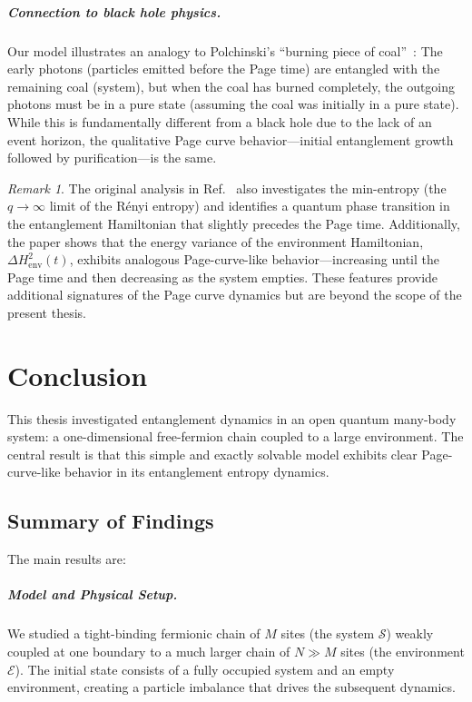 \documentclass[12pt,oneside,openright]{report}
\theoremstyle{definition}
\theoremstyle{plain}
\theoremstyle{remark}
\newtheorem{remark}{Remark}[chapter]
\begin{document}
\paragraph{Connection to black hole physics.}
Our model illustrates an analogy to Polchinski's ``burning piece of coal''~\cite{Polchinski_2016}: The early photons (particles emitted before the Page time) are entangled with the remaining coal (system), but when the coal has burned completely, the outgoing photons must be in a pure state (assuming the coal was initially in a pure state). While this is fundamentally different from a black hole due to the lack of an event horizon, the qualitative Page curve behavior---initial entanglement growth followed by purification---is the same.

\begin{remark}
The original analysis in Ref.~\cite{Kehrein_2024} also investigates the min-entropy (the $q \to \infty$ limit of the Rényi entropy) and identifies a quantum phase transition in the entanglement Hamiltonian that slightly precedes the Page time. Additionally, the paper shows that the energy variance of the environment Hamiltonian, $\Delta H_{\mathrm{env}}^2(t)$, exhibits analogous Page-curve-like behavior---increasing until the Page time and then decreasing as the system empties. These features provide additional signatures of the Page curve dynamics but are beyond the scope of the present thesis.
\end{remark}

\chapter{Conclusion}
\label{ch:conclusion}

This thesis investigated entanglement dynamics in an open quantum many-body system: a one-dimensional free-fermion chain coupled to a large environment.
The central result is that this simple and exactly solvable model exhibits clear Page-curve-like behavior in its entanglement entropy dynamics.

\section{Summary of Findings}
\label{sec:summary}

The main results are:

\paragraph{Model and Physical Setup.}
We studied a tight-binding fermionic chain of $M$ sites (the system $\mathcal{S}$) weakly coupled at one boundary to a much larger chain of $N \gg M$ sites (the environment $\mathcal{E}$). The initial state consists of a fully occupied system and an empty environment, creating a particle imbalance that drives the subsequent dynamics.
\end{document}
